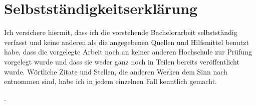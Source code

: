 
\section*{Selbstständigkeitserklärung}

Ich versichere hiermit, dass ich die vorstehende Bachelorarbeit selbstständig verfasst und keine anderen als die angegebenen Quellen und Hilfsmittel benutzt habe, dass die vorgelegte Arbeit noch an keiner anderen Hochschule zur Prüfung vorgelegt wurde und dass sie weder ganz noch in Teilen bereits veröffentlicht wurde. Wörtliche Zitate und Stellen, die anderen Werken dem Sinn nach entnommen sind, habe ich in jedem einzelnen Fall kenntlich gemacht.

\vspace{\baselineskip}

\noindent%
\number{}.~~

\vspace{3\baselineskip}

\noindent \thesisauthor

\thispagestyle{empty}